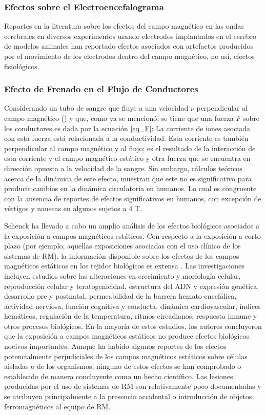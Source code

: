 \subsubsection{Efectos sobre el Electroencefalograma}
Reportes en la literatura sobre los efectos del campo magnético en las ondas cerebrales en diversos experimentos usando electrodos implantados en el cerebro de modelos animales  han reportado efectos asociados con artefactos producidos por el movimiento de los electrodos dentro del campo magnético, no así, efectos fisiológicos.

\subsubsection{Efecto de Frenado en el Flujo de Conductores} 
Considerando un tubo de sangre que fluye a una velocidad $\nu$ perpendicular al campo magnético (\Bzero) y que, como ya se mencionó, se tiene que una fuerza $F$ sobre los conductores es dada por la ecuación \ref{eq_F}:
La corriente de iones asociada con esta fuerza está relacionada a la conductividad. Esta corriente es también perpendicular al campo magnético  y al flujo; es el resultado de la interacción de esta corriente y el campo magnético estático y otra fuerza que se encuentra en dirección opuesta a la velocidad de la sangre. Sin embargo, cálculos teóricos acerca de la dinámica de este efecto, muestran que este no es significativo para producir cambios en la dinámica circulatoria en humanos. Lo cual es congruente con la ausencia de reportes de efectos significativos en humanos, con excepción de vértigos y nauseas en algunos sujetos a 4 T.

Schenck \cite{Schenck_2000,Schenck_1992} ha llevado a cabo un amplio análisis de los efectos biológicos asociados a la exposición a campos magnéticos estáticos. Con respecto a la exposición a corto plazo (por ejemplo, aquellas exposiciones asociadas con el uso clínico de los sistemas de RM), la información disponible sobre los efectos de los campos magnéticos estáticos en los tejidos biológicos es extensa \cite{Schenck_2000,Schenck_1992,Besson_Foreman_Eastwood_Smith_Ashcroft_1984}. Las investigaciones incluyen estudios sobre las alteraciones en crecimiento y morfología celular, reproducción celular y teratogenicidad, estructura del ADN y expresión genética, desarrollo pre y postnatal, permeabilidad de la barrera hemato-encefálica, actividad nerviosa, función cognitiva y conducta, dinámica cardiovascular, índices hemáticos, regulación de la temperatura, ritmos circadianos, respuesta inmune y otros procesos biológicos. En la mayoría de estos estudios, los autores concluyeron que la exposición a campos magnéticos estáticos no produce efectos biológicos nocivos importantes. Aunque ha habido algunos reportes de los efectos potencialmente perjudiciales de los campos magnéticos estáticos sobre células aisladas o de los organismos, ninguno de estos efectos se han comprobado o establecido de manera concluyente como un hecho científico. Las lesiones producidas por el uso de sistemas de RM son relativamente poco documentadas y se atribuyen principalmente a la presencia accidental o introducción de objetos ferromagnéticos al equipo de RM.


